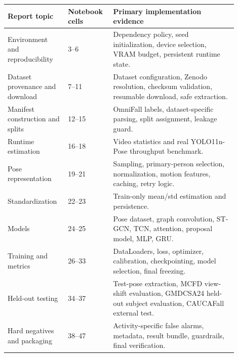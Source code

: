 \documentclass[11pt,a4paper]{article}
\begin{document}
\begin{longtable}{p{0.22\linewidth}p{0.18\linewidth}p{0.50\linewidth}}
\toprule
\textbf{Report topic} & \textbf{Notebook cells} & \textbf{Primary implementation evidence} \\
\midrule
Environment and reproducibility & 3--6 & Dependency policy, seed initialization, device selection, VRAM budget, persistent runtime state. \\
Dataset provenance and download & 7--11 & Dataset configuration, Zenodo resolution, checksum validation, resumable download, safe extraction. \\
Manifest construction and splits & 12--15 & OmniFall labels, dataset-specific parsing, split assignment, leakage guard. \\
Runtime estimation & 16--18 & Video statistics and real YOLO11n-Pose throughput benchmark. \\
Pose representation & 19--21 & Sampling, primary-person selection, normalization, motion features, caching, retry logic. \\
Standardization & 22--23 & Train-only mean/std estimation and persistence. \\
Models & 24--25 & Pose dataset, graph convolution, ST-GCN, TCN, attention, proposal model, MLP, GRU. \\
Training and metrics & 26--33 & DataLoaders, loss, optimizer, calibration, checkpointing, model selection, final freezing. \\
Held-out testing & 34--37 & Test-pose extraction, MCFD view-shift evaluation, GMDCSA24 held-out subject evaluation, CAUCAFall external test. \\
Hard negatives and packaging & 38--47 & Activity-specific false alarms, metadata, result bundle, guardrails, final verification. \\
\bottomrule
\end{longtable}
\end{document}
